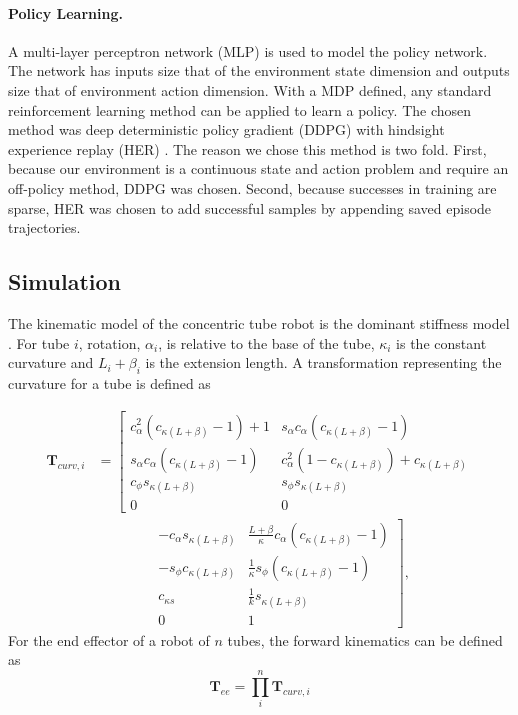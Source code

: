 \paragraph{Policy Learning.} A multi-layer perceptron network (MLP) is used to model the policy network. The network has inputs size that of the environment state dimension and outputs size that of environment action dimension. With a MDP defined, any standard reinforcement learning method can be applied to learn a policy. The chosen method was deep deterministic policy gradient (DDPG) \cite{Lillicrap2015} with hindsight experience replay (HER) \cite{andrychowicz2017hindsight}. The reason we chose this method is two fold. First, because our environment is a continuous state and action problem and require an off-policy method, DDPG was chosen. Second, because successes in training are sparse, HER was chosen to add successful samples by appending saved episode trajectories.

\subsection{Simulation}
The kinematic model of the concentric tube robot is the dominant stiffness model \cite{Dupont2010}. For tube $i$, rotation, $\alpha_i$, is relative to the base of the tube, $\kappa_i$ is the constant curvature and $L_i + \beta_i$ is the extension length. A transformation representing the curvature for a tube is defined as

\begin{equation}\label{curvature-transformation}
\begin{aligned}
\textbf{T}_{curv,i} &=
\left[\begin{matrix}
  c^2_\alpha (c_{\kappa  \left(L+\beta\right)} - 1) + 1 & s_\alpha c_\alpha (c_{\kappa  \left(L+\beta\right)} - 1) \\
  s_\alpha c_\alpha (c_{\kappa  \left(L+\beta\right)} - 1) & c^2_\alpha (1 - c_{\kappa  \left(L+\beta\right)}) + c_{\kappa  \left(L+\beta\right)} \\
  c_{\phi} s_{\kappa  \left(L+\beta\right)} & s_{\phi} s_{\kappa  \left(L+\beta\right)} \\
  0 & 0
\end{matrix}\right.\\
&\qquad\qquad
\left.\begin{matrix}
  - c_\alpha s_{\kappa  \left(L+\beta\right)}  & \frac{L+\beta}{\kappa} c_\alpha (c_{\kappa \left(L+\beta\right)} - 1) \\
  - s_\phi c_{\kappa \left(L+\beta\right)} & \frac{1}{\kappa} s_\phi (c_{\kappa  \left(L+\beta\right)} - 1) \\
  c_{\kappa s} & \frac{1}{k} s_{\kappa  \left(L+\beta\right)} \\
  0 & 1
\end{matrix}\right],
\end{aligned}
\end{equation}
For the end effector of a robot of $n$ tubes, the forward kinematics can be defined as
\begin{equation}
\textbf{T}_{ee} = \prod^{n}_{i} \textbf{T}_{curv,i}
\end{equation}

